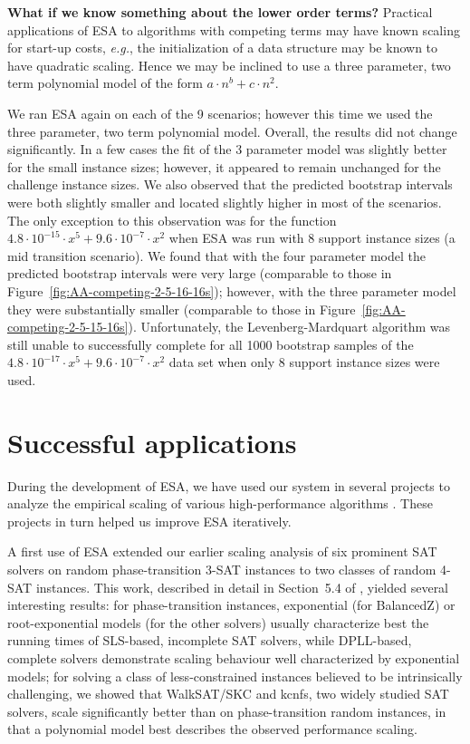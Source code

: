 \documentclass[aic]{iosart2x}
\newcommand{\eg}{\emph{e.g.}}
\begin{document}
\textbf{What if we know something about the lower order terms?}
Practical applications of ESA to algorithms with competing terms may have known scaling for start-up costs, \eg{}, the initialization of a data structure may be known to have quadratic scaling. Hence we may be inclined to use a three parameter, two term polynomial model of the form $a\cdot n^b + c\cdot n^2$. 

We ran ESA again on each of the 9 scenarios; however this time we used the three parameter, two term polynomial model. Overall, the results did not change significantly. In a few cases the fit of the 3 parameter model was slightly better for the small instance sizes; however, it appeared to remain unchanged for the challenge instance sizes. We also observed that the predicted bootstrap intervals were both slightly smaller and located slightly higher in most of the scenarios. The only exception to this observation was for the function $4.8\cdot 10^{-15} \cdot x^5 + 9.6\cdot 10^{-7} \cdot x^2$ when ESA was run with 8 support instance sizes  (a mid transition scenario). We found that with the four parameter model the predicted bootstrap intervals were very large (comparable to those in Figure~\ref{fig:AA-competing-2-5-16-16s}); however, with the three parameter model they were substantially smaller (comparable to those in Figure~\ref{fig:AA-competing-2-5-15-16s}). 
Unfortunately, the Levenberg-Mardquart algorithm was still unable to successfully complete for all 1000 bootstrap samples of the $4.8\cdot 10^{-17} \cdot x^5+ 9.6\cdot 10^{-7} \cdot x^2$ data set when only 8 support instance sizes were used. 


\section{Successful applications}
\label{sec:Successful Applications}

During the development of ESA, we have used our system in several projects to analyze the empirical scaling of various high-performance algorithms \cite{Mu15}. These projects in turn helped us improve ESA iteratively. 

A first use of ESA extended our earlier scaling analysis of six prominent SAT solvers on random phase-transition 3-SAT instances \cite{MuHoo15} to two classes of random 4-SAT instances. This work, described in detail in Section~5.4 of \cite{Mu15}, yielded several interesting results: for phase-transition instances, exponential (for BalancedZ) or root-exponential models (for the other solvers) usually characterize best the running times of SLS-based, incomplete SAT solvers, while DPLL-based, complete solvers demonstrate scaling behaviour well characterized by exponential models; for solving a class of less-constrained instances believed to be intrinsically challenging, we showed that WalkSAT/SKC and kcnfs, two widely studied SAT solvers, scale significantly better than on phase-transition random instances, in that a polynomial model best describes the observed performance scaling.
\end{document}
